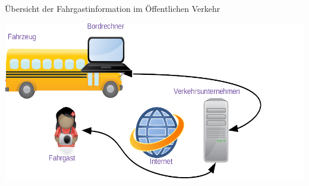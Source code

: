 
\begin{frame}{Übersicht der Fahrgastinformation im Öffentlichen Verkehr}
  \begin{center}
    \includegraphics[width=1.1\textwidth]{agentur-landmobil-june-09.de/public-transport-simple-06-04-2021.png}
  \end{center}
\end{frame}
